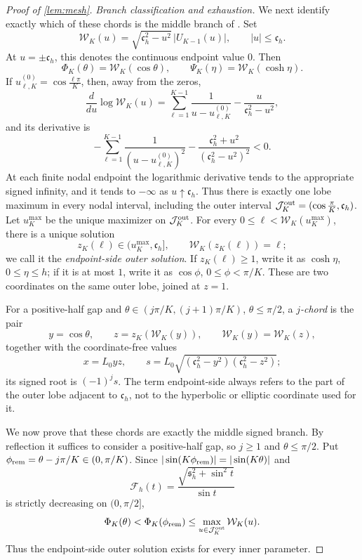 \documentclass[review,hidelinks,onefignum,onetabnum]{siamart251216}
\begin{document}
\begin{proof}[Proof of \cref{lem:mesh}]
\medskip\noindent\emph{Branch classification and exhaustion.}\quad
We next identify exactly which of these chords is the middle branch of
.  Set
\begin{equation}\label{eq:Wcal-def}
 \mathcal W_K(u)=\sqrt{\mathfrak c_h^2-u^2}\,|U_{K-1}(u)|,
 \qquad |u|\leq\mathfrak c_h.
\end{equation}
At \(u=\pm\mathfrak c_h\), this denotes the continuous endpoint value
\(0\).
Then
\[
 \Phi_K(\theta)=\mathcal W_K(\cos\theta),\qquad
 \Psi_K(\eta)=\mathcal W_K(\cosh\eta).
\]
If \(u_{\ell,K}^{(0)}=\cos\frac{\ell\pi}{K}\), then, away from the zeros,
\[
 \frac{d}{du}\log\mathcal W_K(u)
 =\sum_{\ell=1}^{K-1}\frac1{u-u_{\ell,K}^{(0)}}
 -\frac{u}{\mathfrak c_h^2-u^2},
\]
and its derivative is
\begin{equation}\label{eq:W-log-concave}
 -\sum_{\ell=1}^{K-1}\frac1{(u-u_{\ell,K}^{(0)})^2}
 -\frac{\mathfrak c_h^2+u^2}{(\mathfrak c_h^2-u^2)^2}<0.
\end{equation}
At each finite nodal endpoint the logarithmic derivative tends to the
appropriate signed infinity, and it tends to \(-\infty\) as
\(u\uparrow\mathfrak c_h\).  Thus there is exactly one lobe maximum in
every nodal
interval, including the outer interval
\(\mathcal J_K^{\rm out}=(\cos\frac{\pi}{K},\mathfrak c_h)\).  Let
\(u_K^{\max}\) be the unique maximizer on \(\mathcal J_K^{\rm out}\).
For every
\(0\leq\ell<\mathcal W_K(u_K^{\max})\), there is a unique solution
\[
 z_K(\ell)\in(u_K^{\max},\mathfrak c_h],\qquad
 \mathcal W_K(z_K(\ell))=\ell;
\]
we call it the \emph{endpoint-side outer solution}.  If
\(z_K(\ell)\geq1\), write it as \(\cosh\eta\),
\(0\leq\eta\leq h\); if it is at most \(1\), write it as
\(\cos\phi\), \(0\leq\phi<\pi/K\).  These are two coordinates on the
same outer lobe, joined at \(z=1\).

For a positive-half gap and
\(\theta\in(j\pi/K,(j+1)\pi/K)\), \(\theta\leq\pi/2\), a
\emph{$j$-chord} is the pair
\[
 y=\cos\theta,\qquad
 z=z_K(\mathcal W_K(y)),\qquad
 \mathcal W_K(y)=\mathcal W_K(z),
\]
together with the coordinate-free values
\[
 x=L_0yz,\qquad
 s=L_0\sqrt{(\mathfrak c_h^2-y^2)(\mathfrak c_h^2-z^2)};
\]
its signed root is
\((-1)^js\).  The term endpoint-side always refers to the part of the
outer lobe adjacent to \(\mathfrak c_h\), not to the hyperbolic or elliptic
coordinate used for it.

We now prove that these chords are exactly the middle signed branch.  By
reflection it suffices to consider a positive-half gap, so \(j\geq1\)
and \(\theta\leq\pi/2\).  Put
\(\phi_{\rm rem}=\theta-j\pi/K\in(0,\pi/K)\).  Since
\(|\sin(K\phi_{\rm rem})|=|\sin(K\theta)|\) and
\[
 \mathcal F_h(t)=
 \frac{\sqrt{\mathfrak s_h^2+\sin^2t}}{\sin t}
\]
is strictly decreasing on \((0,\pi/2]\),
\begin{equation}\label{eq:outer-level-dominates}
 \Phi_K(\theta)<\Phi_K(\phi_{\rm rem})
 \leq\max_{u\in\mathcal J_K^{\rm out}}\mathcal W_K(u).
\end{equation}
Thus the endpoint-side outer solution exists for every inner parameter.


\end{proof}
\end{document}
